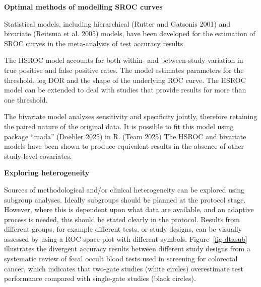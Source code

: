 \documentclass[
  11pt,
  a4paper,
  DIV=11,
  numbers=noendperiod]{scrreprt}
\begin{document}
\textbf{Optimal methods of modelling SROC curves}

Statistical models, including hierarchical (Rutter and Gatsonis 2001)
and bivariate (Reitsma et al. 2005) models, have been developed for the
estimation of SROC curves in the meta-analysis of test accuracy results.

The HSROC model accounts for both within- and between-study variation in
true positive and false positive rates. The model estimates parameters
for the threshold, log DOR and the shape of the underlying ROC curve.
The HSROC model can be extended to deal with studies that provide
results for more than one threshold.

The bivariate model analyses sensitivity and specificity jointly,
therefore retaining the paired nature of the original data. It is
possible to fit this model using package ``mada'' (Doebler 2025) in R.
(Team 2025) The HSROC and bivariate models have been shown to produce
equivalent results in the absence of other study-level covariates.

\textbf{Exploring heterogeneity}

Sources of methodological and/or clinical heterogeneity can be explored
using subgroup analyses. Ideally subgroups should be planned at the
protocol stage. However, where this is dependent upon what data are
available, and an adaptive process is needed, this should be stated
clearly in the protocol. Results from different groups, for example
different tests, or study designs, can be visually assessed by using a
ROC space plot with different symbols. Figure~\ref{fig-dtasub}
illustrates the divergent accuracy results between different study
designs from a systematic review of fecal occult blood tests used in
screening for colorectal cancer, which indicates that two-gate studies
(white circles) overestimate test performance compared with single-gate
studies (black circles).
\end{document}
